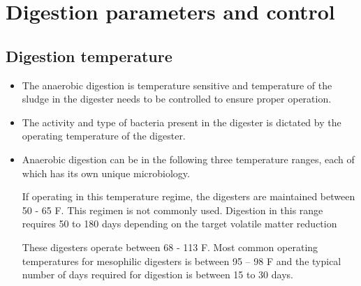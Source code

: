 \section{Digestion parameters and control}

\subsection{Digestion temperature}
                    \begin{itemize}
                        \item The anaerobic digestion is temperature sensitive and temperature of the sludge in the digester needs to be controlled to ensure proper operation.
                        \item The activity and type of bacteria present in the digester is dictated by the operating temperature of the digester.
                        \item Anaerobic digestion can be in the following three temperature ranges, each of which has its own unique microbiology.\\
                            \begin{enumerate}[i.]
                          
                                If operating in this temperature regime, the digesters are maintained between 50  - 65 F.  This regimen is not commonly used.  Digestion in this range requires 50 to 180 days depending on the target volatile matter reduction\\

                                These digesters operate between 68  - 113 F.  Most common operating temperatures for mesophilic digesters is between 95 – 98 F and the typical number of days required for digestion is between 15 to 30 days.\\
                                

\end{enumerate}
\end{itemize}
